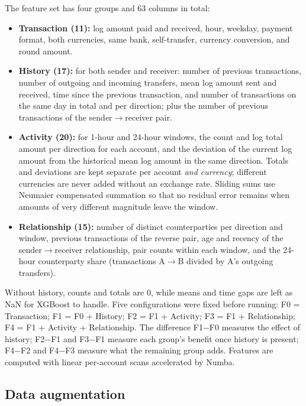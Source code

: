 \documentclass[sigconf,nonacm]{acmart}
\begin{document}
The feature set has four groups and 63 columns in total:
\begin{itemize}
  \item \textbf{Transaction (11):} log amount paid and received, hour, weekday, payment format, both currencies,
  same bank, self-transfer, currency conversion, and round amount.
  \item \textbf{History (17):} for both sender and receiver: number of previous transactions, number of outgoing and
  incoming transfers, mean log amount sent and received, time since the previous transaction, and number of
  transactions on the same day in total and per direction; plus the number of previous transactions of the
  sender$\to$receiver pair.
  \item \textbf{Activity (20):} for 1-hour and 24-hour windows, the count and log total amount per direction for each
  account, and the deviation of the current log amount from the historical mean log amount in the same direction.
  Totals and deviations are kept separate per account \emph{and currency}; different currencies are never added
  without an exchange rate. Sliding sums use Neumaier compensated summation so that no residual error remains when
  amounts of very different magnitude leave the window.
  \item \textbf{Relationship (15):} number of distinct counterparties per direction and window, previous transactions
  of the reverse pair, age and recency of the sender$\to$receiver relationship, pair counts within each window, and
  the 24-hour counterparty share (transactions A$\to$B divided by A's outgoing transfers).
\end{itemize}
Without history, counts and totals are 0, while means and time gaps are left as NaN for XGBoost to handle. Five
configurations were fixed before running: F0 = Transaction; F1 = F0 + History; F2 = F1 + Activity; F3 = F1 +
Relationship; F4 = F1 + Activity + Relationship. The difference F1$-$F0 measures the effect of history; F2$-$F1 and
F3$-$F1 measure each group's benefit once history is present; F4$-$F2 and F4$-$F3 measure what the remaining group
adds. Features are computed with linear per-account scans accelerated by Numba.

\subsection{Data augmentation}
\end{document}
